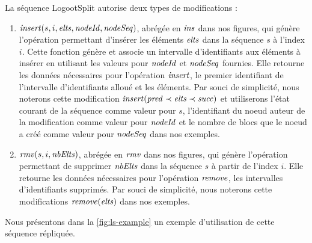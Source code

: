 La séquence LogootSplit autorise deux types de modifications :
\begin{enumerate}
  \item $\mathit{insert}(s, i, \mathit{elts}, \mathit{nodeId}, \mathit{nodeSeq})$, abrégée en $\mathit{ins}$ dans nos figures, qui génère l'opération permettant d'insérer les éléments $\mathit{elts}$ dans la séquence $s$ à l'index $i$.
    Cette fonction génère et associe un intervalle d'identifiants aux éléments à insérer en utilisant les valeurs pour $\mathit{nodeId}$ et $\mathit{nodeSeq}$ fournies.
    Elle retourne les données nécessaires pour l'opération $\mathit{insert}$, \ie le premier identifiant de l'intervalle d'identifiants alloué et les éléments.
    Par souci de simplicité, nous noterons cette modification $\mathit{insert}(\mathit{pred} \prec \mathit{elts} \prec \mathit{succ})$ et utiliserons l'état courant de la séquence comme valeur pour $s$, l'identifiant du noeud auteur de la modification comme valeur pour $\mathit{nodeId}$ et le nombre de blocs que le noeud a créé comme valeur pour $\mathit{nodeSeq}$ dans nos exemples.
  \item  $\mathit{rmv}(s, i, \mathit{nbElts})$, abrégée en $\mathit{rmv}$ dans nos figures, qui génère l'opération permettant de supprimer $\mathit{nbElts}$ dans la séquence $s$ à partir de l'index $i$.
    Elle retourne les données nécessaires pour l'opération $\mathit{remove}$, \ie les intervalles d'identifiants supprimés.
    Par souci de simplicité, nous noterons cette modifications $\mathit{remove}(\mathit{elts})$ dans nos exemples.
\end{enumerate}

Nous présentons dans la \autoref{fig:ls-example} un exemple d'utilisation de cette séquence répliquée.

